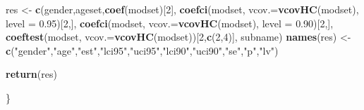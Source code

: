 \documentclass[
]{article}
\newenvironment{Shaded}{\begin{snugshade}}{\end{snugshade}}
\newcommand{\DataTypeTok}[1]{\textcolor[rgb]{0.13,0.29,0.53}{#1}}
\newcommand{\DecValTok}[1]{\textcolor[rgb]{0.00,0.00,0.81}{#1}}
\newcommand{\FloatTok}[1]{\textcolor[rgb]{0.00,0.00,0.81}{#1}}
\newcommand{\KeywordTok}[1]{\textcolor[rgb]{0.13,0.29,0.53}{\textbf{#1}}}
\newcommand{\NormalTok}[1]{#1}
\newcommand{\StringTok}[1]{\textcolor[rgb]{0.31,0.60,0.02}{#1}}
\begin{document}
\begin{Shaded}
\begin{Highlighting}[]
\NormalTok{  res <-}\StringTok{ }\KeywordTok{c}\NormalTok{(gender,ageset,}\KeywordTok{coef}\NormalTok{(modset)[}\DecValTok{2}\NormalTok{],}
           \KeywordTok{coefci}\NormalTok{(modset, }\DataTypeTok{vcov.=}\KeywordTok{vcovHC}\NormalTok{(modset), }\DataTypeTok{level =} \FloatTok{0.95}\NormalTok{)[}\DecValTok{2}\NormalTok{,],}
           \KeywordTok{coefci}\NormalTok{(modset, }\DataTypeTok{vcov.=}\KeywordTok{vcovHC}\NormalTok{(modset), }\DataTypeTok{level =} \FloatTok{0.90}\NormalTok{)[}\DecValTok{2}\NormalTok{,],}
           \KeywordTok{coeftest}\NormalTok{(modset, }\DataTypeTok{vcov.=}\KeywordTok{vcovHC}\NormalTok{(modset))[}\DecValTok{2}\NormalTok{,}\KeywordTok{c}\NormalTok{(}\DecValTok{2}\NormalTok{,}\DecValTok{4}\NormalTok{)],}
\NormalTok{           subname)}
  \KeywordTok{names}\NormalTok{(res) <-}\StringTok{ }\KeywordTok{c}\NormalTok{(}\StringTok{"gender"}\NormalTok{,}\StringTok{"age"}\NormalTok{,}\StringTok{"est"}\NormalTok{,}\StringTok{"lci95"}\NormalTok{,}\StringTok{"uci95"}\NormalTok{,}\StringTok{"lci90"}\NormalTok{,}\StringTok{"uci90"}\NormalTok{,}\StringTok{"se"}\NormalTok{,}\StringTok{"p"}\NormalTok{,}\StringTok{"lv"}\NormalTok{)}
  
  \KeywordTok{return}\NormalTok{(res)}
  
\NormalTok{\}}


\end{Highlighting}
\end{Shaded}
\end{document}

